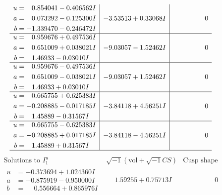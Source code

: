 \documentclass[1p]{elsarticle_modified}
\theoremstyle{definition}
\newcommand{\I}{\sqrt{-1}}
\begin{document}
$$\begin{array}{c|c|c}
\begin{aligned}
u &= \phantom{-}0.854041 - 0.406562 I \\
a &= \phantom{-}0.073292 - 0.125300 I \\
b &= -1.339470 - 0.246472 I\end{aligned}
 & -3.53513 + 0.33068 I & \phantom{-0.000000 } 0 \\ \hline\begin{aligned}
u &= \phantom{-}0.959676 + 0.497536 I \\
a &= \phantom{-}0.651009 + 0.038021 I \\
b &= \phantom{-}1.46933 - 0.03010 I\end{aligned}
 & -9.03057 - 1.52462 I & \phantom{-0.000000 } 0 \\ \hline\begin{aligned}
u &= \phantom{-}0.959676 - 0.497536 I \\
a &= \phantom{-}0.651009 - 0.038021 I \\
b &= \phantom{-}1.46933 + 0.03010 I\end{aligned}
 & -9.03057 + 1.52462 I & \phantom{-0.000000 } 0 \\ \hline\begin{aligned}
u &= \phantom{-}0.665755 + 0.625383 I \\
a &= -0.208885 - 0.017185 I \\
b &= \phantom{-}1.45889 - 0.31567 I\end{aligned}
 & -3.84118 + 4.56251 I & \phantom{-0.000000 } 0 \\ \hline\begin{aligned}
u &= \phantom{-}0.665755 - 0.625383 I \\
a &= -0.208885 + 0.017185 I \\
b &= \phantom{-}1.45889 + 0.31567 I\end{aligned}
 & -3.84118 - 4.56251 I & \phantom{-0.000000 } 0\\
 \hline 
 \end{array}$$\newpage$$\begin{array}{c|c|c}  
\text{Solutions to }I^u_{1}& \I (\text{vol} + \sqrt{-1}CS) & \text{Cusp shape}\\
 \hline 
\begin{aligned}
u &= -0.373694 + 1.024360 I \\
a &= -0.875919 - 0.950000 I \\
b &= \phantom{-}0.556664 + 0.865976 I\end{aligned}
 & \phantom{-}1.59255 + 0.75713 I & \phantom{-0.000000 } 0 \\ \hline\begin{aligned}

\end{aligned}
\end{array}$$
\end{document}
